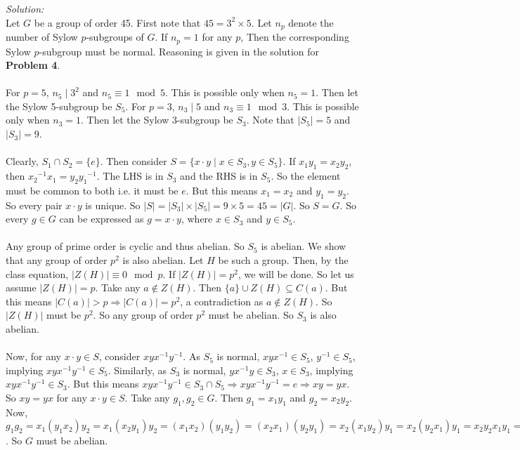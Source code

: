 \documentclass[a4paper, 11pt]{article}
\newenvironment{solution}
    {\textit{Solution:}}
    {}
\begin{document}
\begin{solution}\\
    Let $G$ be a group of order 45.
    First note that $45 = 3^2 \times 5$.
    Let $n_p$ denote the number of Sylow $p$-subgroups of $G$.
    If $n_p = 1$ for any $p$, Then the corresponding Sylow $p$-subgroup must be normal.
    Reasoning is given in the solution for \textbf{Problem 4}.\\\\
    For $p = 5$, $n_5 \mid 3^2$ and $n_5 \equiv 1 \mod{5}$. 
    This is possible only when $n_5 = 1$.
    Then let the Sylow 5-subgroup be $S_5$.
    For $p = 3$, $n_3 \mid 5$ and $n_3 \equiv 1 \mod{3}$. 
    This is possible only when $n_3 = 1$.
    Then let the Sylow 3-subgroup be $S_3$.
    Note that $|S_5| = 5$ and $|S_3| = 9$.\\\\
    Clearly, $S_1 \cap S_2 = \{ e \}$.
    Then consider $S = \{ x \cdot y \mid x \in S_3, y \in S_5 \}$.
    If $x_1 y_1 = x_2 y_2$, then ${x_2}^{-1} x_1 = y_2 {y_1}^{-1}$.
    The LHS is in $S_3$ and the RHS is in $S_5$.
    So the element must be common to both i.e. it must be $e$.
    But this means $x_1 = x_2$ and $y_1 = y_2$.
    So every pair $x \cdot y$ is unique.
    So $|S| = |S_3| \times |S_5| = 9 \times 5 = 45 = |G|$.
    So $S = G$.
    So every $g \in G$ can be expressed as $g = x \cdot y$, where $x \in S_3$ and $y \in S_5$.\\\\
    Any group of prime order is cyclic and thus abelian.
    So $S_5$ is abelian.
    We show that any group of order $p^2$ is also abelian.
    Let $H$ be such a group.
    Then, by the class equation, $|Z(H)| \equiv 0 \mod{p}$.
    If $|Z(H)| = p^2$, we will be done.
    So let us assume $|Z(H)| = p$.
    Take any $a \notin Z(H)$.
    Then $\{ a \} \cup Z(H) \subseteq C(a)$.
    But this means $|C(a)| > p \Rightarrow |C(a)| = p^2$, a contradiction as $a \notin Z(H)$.
    So $|Z(H)|$ must be $p^2$.
    So any group of order $p^2$ must be abelian.
    So $S_3$ is also abelian.\\\\
    Now, for any $x \cdot y \in S$, consider $x y x^{-1} y^{-1}$.
    As $S_5$ is normal, $x y x^{-1} \in S_5$, $y^{-1} \in S_5$, implying $x y x^{-1} y^{-1} \in S_5$.
    Similarly, as $S_3$ is normal, $y x^{-1} y \in S_3$, $x \in S_3$, implying $x y x^{-1} y^{-1} \in S_3$.
    But this means $x y x^{-1} y^{-1} \in S_3 \cap S_5 \Rightarrow x y x^{-1} y^{-1} = e \Rightarrow x y = y x$.
    So $xy = yx$ for any $x \cdot y \in S$.
    Take any $g_1, g_2 \in G$.
    Then $g_1 = x_1 y_1$ and $g_2 = x_2 y_2$.
    Now, $g_1 g_2 = x_1 (y_1 x_2) y_2 = x_1 (x_2 y_1) y_2 = (x_1 x_2) (y_1 y_2) = (x_2 x_1) (y_2 y_1) = x_2 (x_1 y_2) y_1 = x_2 (y_2 x_1) y_1 = x_2 y_2 x_1 y_1 = g_2 g_1$.
    So $G$ must be abelian.
\end{solution}
\end{document}
